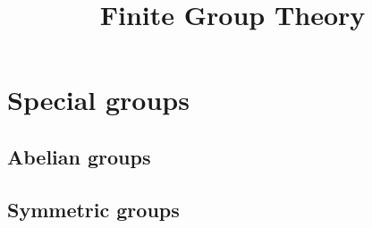 \documentclass{../exp}
\title{Finite Group Theory}
\begin{document}
\maketitle
\tableofcontents

\iffalse
presentation
	quotient of a free group
	homomorphism 잡기
		free group을 정의역으로 먼저 잡고 well-defined 보여서 quotient로 내리기
	element들을 두 제너레이터로 표현하기
isomorphism 보이기
	isomorphism theorem
	order argument
subgroup criterion: 항등원, 역원, 닫힘 순으로 증명
centralizer, center, normalizer
	각 그룹의 계산 -> 기본적으로 노가다, 마지막에 라그랑지 확인
	센트럴라이저의 대칭성
	N(H)/C(H) 정리, G/Z(G)=Inn(G)
stabilizer

cyclic group


Heisenberg group


Three actions
- left multiplication on coset space
- conjugation on a set of some subgroups
- conjugation on a normal subgroup



아벨리안임을 보이기
	G/Z(G) is cyclic
	|G|=p^2
	n-abelian
		G^n commutes G^{n-1}
		surjective cube endomorphism
		n-abelian implies n(n-1)-central
		order prime to n(n-1)



----------
#
아벨군: 순환군, n-abelian 등 여러 조건, 기본정리
대칭군: 생성원, 트랜지티브, 교대군과 부호
콕세터: 이면군, 프레젠테이션
선형군: 

#
군 확장
컴포지션 시리즈의 이해
반직접: / 계산->아벨군의 자기동형군
중심적: 군코호몰로지 / 계산->보편계수정리

#
액션, 실로우: existence, congruence condition
	카운팅:
	인덱스: 푸앵카레 정리, least prime ind
	소인수분해 형태별 분석
	케이스 나누기에 매우 좋은 조건을 제공
		노말 실로우 -> 바로 반직접곱
p: 1 - 
p2: 2
p3: 5
p4: 14, 15
pq: p<q
	p/q-1: 1
	p|q-1: 2
p2q: p<q
pq2: p<q
p3q?
pqr

#
p군: 비자명센터, 개수 겁나많음
닐포턴트: 피팅, 프라티니
솔버블?
센트럴 시리즈?
단순군: 단순군 아니기 테크닉, 단순군 보이기 테크닉, 교대군과 리타입 선형군


\fi
\section{Special groups}

\subsection{Abelian groups}
\subsection{Symmetric groups}
\end{document}
